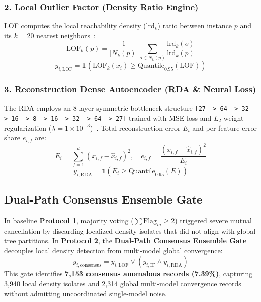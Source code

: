 \documentclass[conference]{IEEEtran}
\begin{document}
\subsubsection{2. Local Outlier Factor (Density Ratio Engine)}
LOF computes the local reachability density ($\text{lrd}_k$) ratio between instance $p$ and its $k=20$ nearest neighbors~\cite{ref24}:
\begin{equation}
\mathrm{LOF}_k(p) = \frac{1}{|N_k(p)|} \sum_{o \in N_k(p)} \frac{\mathrm{lrd}_k(o)}{\mathrm{lrd}_k(p)}
\end{equation}
\begin{equation}
y_{i, \mathrm{LOF}} = \mathbf{1}\left(\mathrm{LOF}_k(x_i) \ge \mathrm{Quantile}_{0.95}(\mathrm{LOF})\right)
\end{equation}

\subsubsection{3. Reconstruction Dense Autoencoder (RDA \& Neural Loss)}
The RDA employs an 8-layer symmetric bottleneck structure \texttt{[27 -> 64 -> 32 -> 16 -> 8 -> 16 -> 32 -> 64 -> 27]} trained with MSE loss and $L_2$ weight regularization ($\lambda = 1\times 10^{-3}$)~\cite{ref32}. Total reconstruction error $E_i$ and per-feature error share $e_{i,f}$ are:
\begin{equation}
E_i = \sum_{f=1}^{d} (x_{i,f} - \hat{x}_{i,f})^2, \quad e_{i,f} = \frac{(x_{i,f} - \hat{x}_{i,f})^2}{E_i}
\end{equation}
\begin{equation}
y_{i, \mathrm{RDA}} = \mathbf{1}\left(E_i \ge \mathrm{Quantile}_{0.95}(E)\right)
\end{equation}

\subsection{Dual-Path Consensus Ensemble Gate}

In baseline \textbf{Protocol 1}, majority voting ($\sum \text{Flag}_m \ge 2$) triggered severe mutual cancellation by discarding localized density isolates that did not align with global tree partitions. In \textbf{Protocol 2}, the \textbf{Dual-Path Consensus Ensemble Gate} decouples local density detection from multi-model global convergence:
\begin{equation}
y_{i, \mathrm{consensus}} = y_{i, \mathrm{LOF}} \lor \left(y_{i, \mathrm{IF}} \land y_{i, \mathrm{RDA}}\right)
\end{equation}
This gate identifies \textbf{7,153 consensus anomalous records (7.39\%)}, capturing 3,940 local density isolates and 2,314 global multi-model convergence records without admitting uncoordinated single-model noise.
\end{document}

